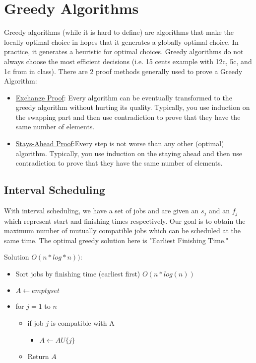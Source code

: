 \documentclass{article}
\begin{document}
\section{Greedy Algorithms}
Greedy algorithms (while it is hard to define) are algorithms that make the locally optimal choice in hopes that it generates a globally optimal choice. In practice, it generates a heuristic for optimal choices. Greedy algorithms do not always choose the most efficient decisions (i.e. 15 cents example with 12c, 5c, and 1c from in class). There are 2 proof methods generally used to prove a Greedy Algorithm:

\begin{itemize}
    \item \underline{Exchange Proof}: Every algorithm can be eventually transformed to the greedy
      algorithm without hurting its quality. Typically, you use induction on the swapping part and then use contradiction to prove that they have the same number of elements.
    \item \underline{Stays-Ahead Proof}:Every step is not worse than any other (optimal) algorithm.
      Typically, you use induction on the staying ahead and then use contradiction to prove that they have the same number of elements.
\end{itemize}

\subsection{Interval Scheduling}
With interval scheduling, we have a set of jobs and are given an $s_j$ and an $f_j$ which represent start and finishing times respectively. Our goal is to obtain the maximum number of mutually compatible jobs which can be scheduled at the same time. The optimal greedy solution here is "Earliest Finishing Time." 

Solution $O(n*log*n))$:
\begin{itemize}
    \item Sort jobs by finishing time (earliest first) $O(n*log(n))$
    \item $A \gets empty set$
    \item for $j = 1$ to $n$ \begin{itemize}
        \item if job $j$ is compatible with A \begin{itemize}
            \item $A \gets A U \{j\}$
        \end{itemize}
    \item Return $A$
    \end{itemize}
\end{itemize}
\end{document}
